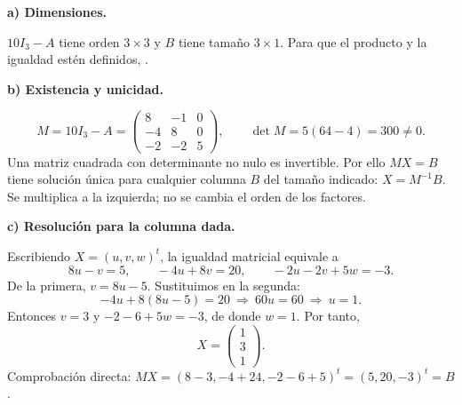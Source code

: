 \textbf{a) Dimensiones.}\par\nopagebreak[4]
$10I_3-A$ tiene orden $3\times3$ y $B$ tiene tamaño $3\times1$. Para que el producto y la igualdad estén definidos, .

\textbf{b) Existencia y unicidad.}\par\nopagebreak[4]
\[
M=10I_3-A=\begin{pmatrix}8&-1&0\\-4&8&0\\-2&-2&5\end{pmatrix},
\qquad\det M=5(64-4)=300\ne0.
\]
Una matriz cuadrada con determinante no nulo es invertible. Por ello $MX=B$ tiene solución única para cualquier columna $B$ del tamaño indicado: $X=M^{-1}B$. Se multiplica a la izquierda; no se cambia el orden de los factores.

\textbf{c) Resolución para la columna dada.}\par\nopagebreak[4]
Escribiendo $X=(u,v,w)^t$, la igualdad matricial equivale a
\[
8u-v=5,\qquad-4u+8v=20,\qquad-2u-2v+5w=-3.
\]
De la primera, $v=8u-5$. Sustituimos en la segunda:
\[
-4u+8(8u-5)=20\ \Longrightarrow\ 60u=60\ \Longrightarrow\ u=1.
\]
Entonces $v=3$ y $-2-6+5w=-3$, de donde $w=1$. Por tanto,
\[
\boxed{X=\begin{pmatrix}1\\3\\1\end{pmatrix}.}
\]
Comprobación directa: $MX=(8-3,-4+24,-2-6+5)^t=(5,20,-3)^t=B$.
